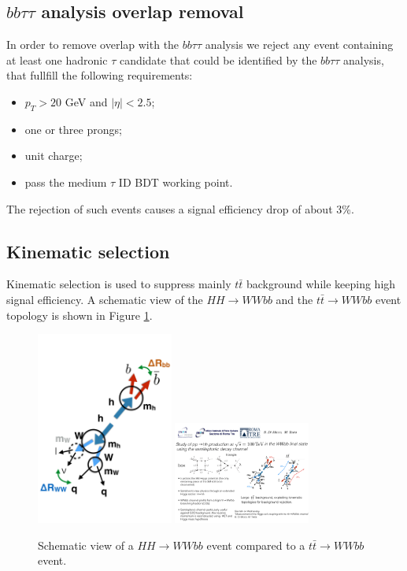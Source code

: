 \subsection{$bb\tau\tau$ analysis overlap removal}
In order to remove overlap with the $bb\tau \tau$ analysis we reject
any event containing at least one hadronic $\tau$ candidate that could be
identified by the $bb\tau\tau$ analysis, that fullfill the following
requirements:
\begin{itemize}
\item $p_T > 20$ GeV and $|\eta| < 2.5$;
\item one or three prongs;
\item unit charge;
\item pass the medium $\tau$ ID BDT working point.
\end{itemize}

The rejection of such events causes a signal efficiency drop of about 3\%.

\subsection{Kinematic selection}
\label{subsec:kincuts}


Kinematic selection is used to suppress mainly $t\bar{t}$ background while keeping
high signal efficiency.  A schematic view of the $HH \to WWbb$ and the
$t \bar{t} \to WWbb$ event topology is shown in Figure \ref{fig:cartoon}.
\begin{figure}
\includegraphics[width=0.4\textwidth]{figures/cartoon_hh.pdf}
\includegraphics[width=0.4\textwidth]{figures/cartoon_tt.pdf}
\caption{Schematic view of a $HH \to WWbb$ event compared to a $t\bar{t} \to WWbb$ event.} 
\label{fig:cartoon}
\end{figure}

